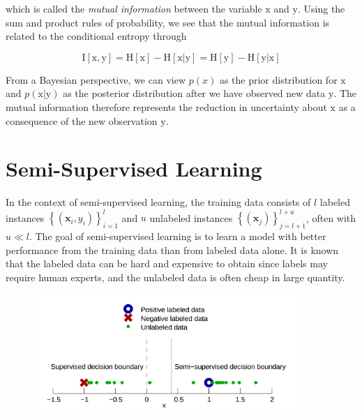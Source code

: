 \documentclass{article}
\begin{document}
which is called the \textit{mutual information} between the variable
$\mathrm{x}$ and $\mathrm{y}$. Using the sum and product rules of
probability, we see that the mutual information is related to the
conditional entropy through

\begin{equation}
  \mathrm{I}[\mathrm{x}, \mathrm{y}] = \mathrm{H}[\mathrm{x}] -
  \mathrm{H}[\mathrm{x|y}] = \mathrm{H}[\mathrm{y}] -
  \mathrm{H}[\mathrm{y|x}]
\end{equation}

From a Bayesian perspective, we can view $p(x)$ as the prior
distribution for $\mathrm{x}$ and $p(\mathrm{x}|\mathrm{y})$ as the posterior
distribution after we have observed new data $\mathrm{y}$. The mutual
information therefore represents the reduction in uncertainty about
$\mathrm{x}$ as a consequence of the new observation $\mathrm{y}$.

\section{Semi-Supervised Learning}
In the context of semi-supervised learning, the training data consists
of $l$ labeled instances $\left \{ (\mathbf{x}_i, y_i)
\right \}_{i=1}^{l}$ and $u$ unlabeled instances $\left \{ (\mathbf{x}_j)
\right \}_{j=l+1}^{l+u}$, often with $u \ll l$. The goal of
semi-supervised learning is to learn a model with better performance
from the training data than from labeled data alone. It is known that
the labeled data can be hard and expensive to obtain since labels may
require human experts, and the unlabeled data is often cheap in large
quantity.

\begin{figure}[h] \label{fg:ssl_model}
\includegraphics[width=10cm]{ssl.png}
\end{figure}
\end{document}
